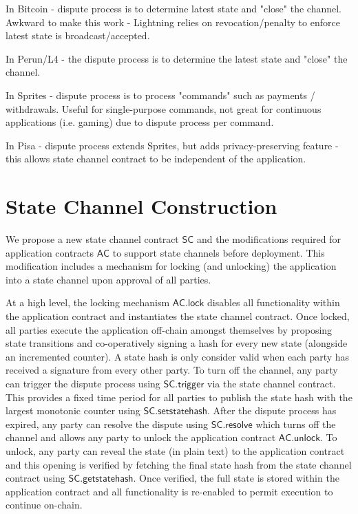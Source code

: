 \documentclass{llncs}
\newcommand{\statechannel}{\mathsf{SC}}
\newcommand{\statechanneldispute}{\mathsf{SC}.\mathsf{trigger}}
\newcommand{\statechannelsetstate}{\mathsf{SC}.\mathsf{setstatehash}}
\newcommand{\statechannelresolve}{\mathsf{SC}.\mathsf{resolve}}
\newcommand{\statechannelgetcommitment}{\mathsf{SC}.\mathsf{getstatehash}}
\newcommand{\appcontract}{\mathsf{AC}}
\newcommand{\applock}{\mathsf{AC.lock}}
\newcommand{\appunlock}{\mathsf{AC.unlock}}
\begin{document}
In Bitcoin - dispute process is to determine latest state and "close" the channel. Awkward to make this work - Lightning relies on revocation/penalty to enforce latest state is broadcast/accepted. 

In Perun/L4 - the dispute process is to determine the latest state and "close" the channel. 

In Sprites - dispute process is to process "commands" such as payments / withdrawals. Useful for single-purpose commands, not great for continuous applications (i.e. gaming) due to dispute process per command.

In Pisa - dispute process extends Sprites, but adds privacy-preserving feature - this allows state channel contract to be independent of the application. 

\section{State Channel Construction} 

We propose a new state channel contract $\statechannel$ and the modifications required for  application contracts $\appcontract$  to support state channels before deployment. 
This modification includes a mechanism for locking (and unlocking) the application into a state channel upon approval of all parties. 

At a high level, the locking mechanism $\applock$ disables all functionality within the application contract and instantiates the state channel contract. 
Once locked, all parties execute the application off-chain amongst themselves by proposing state transitions and co-operatively signing a hash for every new state (alongside an incremented counter). 
A state hash is only consider valid when each party has received a signature from every other party. 
To turn off the channel, any party can trigger the dispute process using $\statechanneldispute$ via the state channel contract.
This provides  a fixed time period  for all parties to publish the state hash with the largest monotonic counter using $\statechannelsetstate$. 
After the dispute process has expired, any party can resolve the dispute using $\statechannelresolve$ which turns off the channel and allows any party to unlock the application contract $\appunlock$. 
To unlock, any party can reveal the state (in plain text) to the application contract and this opening is verified by fetching the final state hash from the state channel contract using  $\statechannelgetcommitment$. 
Once verified, the full state is stored within the application contract and all functionality is re-enabled to permit execution to continue on-chain. 
\end{document}

